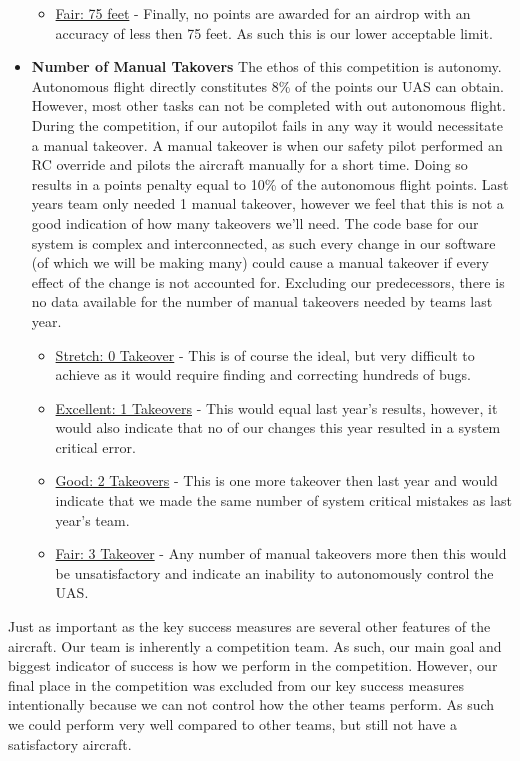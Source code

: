 \documentclass[]{auvsi_doc}
\begin{document}
\begin{itemize}
\begin{itemize}
	\item  \underline{Fair: 75 feet} -  Finally, no points are awarded for an airdrop with an accuracy of less then 75 feet. As such this is our lower acceptable limit.
	\end{itemize}
\item \textbf{Number of Manual Takovers} The ethos of this competition is autonomy. Autonomous flight directly constitutes 8\% of the points our UAS can obtain. However, most other tasks can not be completed with out autonomous flight. During the competition, if our autopilot fails in any way it would necessitate a manual takeover. A manual takeover is when our safety pilot performed an RC override and pilots the aircraft manually for a short time. Doing so results in a points penalty equal to 10\% of the autonomous flight points. Last years team only needed 1 manual takeover, however we feel that this is not a good indication of how many takeovers we'll need. The code base for our system is complex and interconnected, as such every change in our software (of which we will be making many) could cause a manual takeover if every effect of the change is not accounted for. Excluding our predecessors, there is no data available for the number of manual takeovers needed by teams last year.
	\begin{itemize}
	\item \underline{Stretch: 0 Takeover} - This is of course the ideal, but very difficult to achieve as it would require finding and correcting hundreds of bugs.
	\item \underline{Excellent: 1 Takeovers} -  This would equal last year's results, however, it would also indicate that no of our changes this year resulted in a system critical error.
	\item \underline{Good: 2 Takeovers} -  This is one more takeover then last year and would indicate that we made the same number of system critical mistakes as last year's team. 
	\item  \underline{Fair: 3 Takeover} -  Any number of manual takeovers more then this would be unsatisfactory and indicate an inability to autonomously control the UAS.
	\end{itemize}
\end{itemize}

Just as important as the key success measures are several other features of the aircraft. Our team is inherently a competition team. As such, our main goal and biggest indicator of success is how we perform in the competition. However, our final place in the competition was excluded from our key success measures intentionally because we can not control how the other teams perform. As such we could perform very well compared to other teams, but still not have a satisfactory aircraft. 
\end{document}
